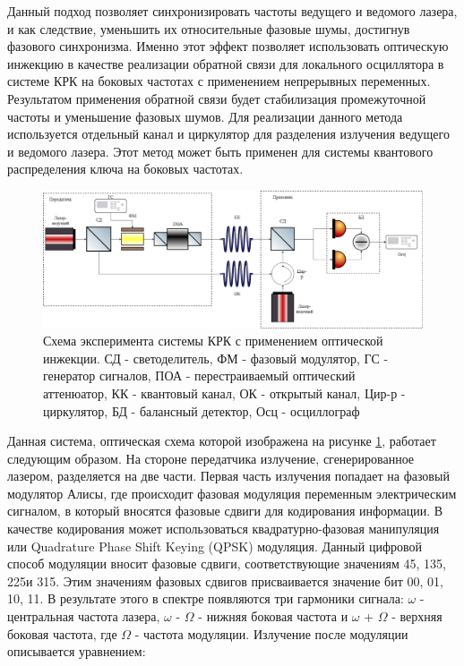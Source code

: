 Данный подход позволяет синхронизировать частоты ведущего и ведомого лазера, и как следствие, уменьшить их относительные фазовые шумы, достигнув фазового синхронизма. Именно этот эффект позволяет использовать оптическую инжекцию в качестве реализации обратной связи для локального осциллятора в системе КРК на боковых частотах с применением непрерывных переменных. Результатом применения обратной связи будет стабилизация промежуточной частоты и уменьшение фазовых шумов. Для реализации данного метода используется отдельный канал и циркулятор для разделения излучения ведущего и ведомого лазера. 
Этот метод может быть применен для системы квантового распределения ключа на боковых частотах.
\begin{figure}
    \centering
    \includegraphics[width=\textwidth]{images/Схема с обратной связью.png}
    \caption{Схема эксперимента системы КРК с применением оптической инжекции. СД - светоделитель, ФМ - фазовый модулятор, ГС - генератор сигналов, ПОА - перестраиваемый оптический аттенюатор, КК - квантовый канал, ОК - открытый канал, Цир-р - циркулятор, БД - балансный детектор, Осц - осциллограф}
    \label{fig:opt inj scheme}
\end{figure}
Данная система, оптическая схема которой изображена на рисунке \ref{fig:opt inj scheme}, работает следующим образом. На стороне передатчика излучение, сгенерированное лазером, разделяется на две части. Первая часть излучения попадает на фазовый модулятор Алисы, где происходит фазовая модуляция переменным электрическим сигналом, в который вносятся фазовые сдвиги для кодирования информации. В качестве кодирования может использоваться квадратурно-фазовая манипуляция или Quadrature Phase Shift Keying (QPSK) модуляция. Данный цифровой способ модуляции вносит фазовые сдвиги, соответствующие значениям 45\textdegree, 135\textdegree, 225\textdegree и 315\textdegree. Этим значениям фазовых сдвигов присваивается значение бит {00, 01, 10, 11}. В результате этого в спектре появляются три гармоники сигнала: $\omega$ - центральная частота лазера, $\omega$ - $\Omega$ - нижняя боковая частота  и $\omega$ + $\Omega$ - верхняя боковая частота, где $\Omega$ - частота модуляции. Излучение после модуляции описывается уравнением: 
